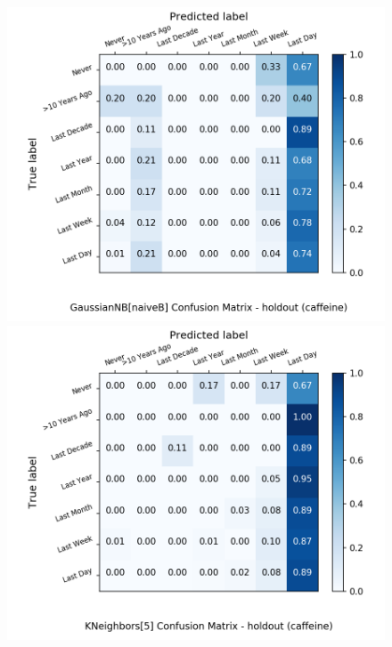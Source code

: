 \begin{figure}[H]
	\begin{minipage}[b]{0.32\textwidth}
		\includegraphics[width=1.1\textwidth]{Plots/drugs/caffeine_GaussianNB_naiveB_balance_False_holdout.png}
	\end{minipage}
	\begin{minipage}[b]{0.32\textwidth}
		\includegraphics[width=1.1\textwidth]{Plots/drugs/caffeine_KNeighbors_5_balance_False_holdout.png}
  \end{minipage}
	\begin{minipage}[b]{0.32\textwidth}

\end{minipage}
\end{figure}
